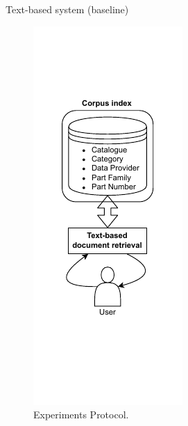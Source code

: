 \begin{frame}{Text-based system (baseline)}

    \begin{figure} [H]
        \begin{center}
            \includegraphics[scale=0.8]{images/tp-expe-text-based-sys.pdf} 
            \caption{Experiments Protocol.} 
        \end{center}
    \end{figure}

\end{frame}

